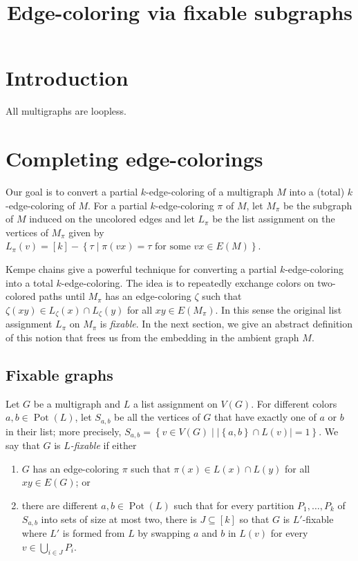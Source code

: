 \documentclass[12pt]{article}
\theoremstyle{plain}
\theoremstyle{definition}
\theoremstyle{remark}
\newcommand{\set}[1]{\left\{ #1 \right\}}
\newcommand{\setb}[3]{\left\{ #1 \in #2 \mid #3 \right\}}
\newcommand{\setbs}[2]{\left\{ #1 \mid #2 \right\}}
\newcommand{\card}[1]{\left|#1\right|}
\newcommand{\irange}[1]{\left[#1\right]}
\newcommand{\pot}{\operatorname{Pot}}
\begin{document}
\title{Edge-coloring via fixable subgraphs}
\maketitle

\section{Introduction}
All multigraphs are loopless.

\section{Completing edge-colorings}
Our goal is to convert a partial $k$-edge-coloring of a multigraph $M$ into a (total) $k$-edge-coloring of $M$.  For a partial $k$-edge-coloring $\pi$ of $M$, let $M_\pi$ be the subgraph of $M$ induced on the uncolored edges and let $L_\pi$ be the list assignment on the vertices of $M_\pi$ given by 
$L_\pi(v) = \irange{k} - \setbs{\tau}{\pi(vx) = \tau \text{ for some  } vx \in E(M)}$. 

Kempe chains give a powerful technique for converting a partial $k$-edge-coloring into a total $k$-edge-coloring.  The idea is to repeatedly exchange colors on two-colored paths until $M_\pi$ has an edge-coloring $\zeta$ such that $\zeta(xy) \in L_\zeta(x) \cap L_\zeta(y)$ for all $xy \in E(M_\pi)$.  In this sense the original list assignment $L_\pi$ on $M_\pi$ is \emph{fixable}. In the next section, we give an abstract definition of this notion that frees us from the embedding in the ambient graph $M$.

\subsection{Fixable graphs}
Let $G$ be a multigraph and $L$ a list assignment on $V(G)$.  For different colors $a,b \in \pot(L)$, let $S_{a,b}$ be all the vertices of $G$ that have exactly one of $a$ or $b$ in their list; more precisely, $S_{a,b} = \setb{v}{V(G)}{\card{\set{a,b} \cap L(v)} = 1}$.  We say that $G$ is \emph{$L$-fixable} if either
\begin{enumerate}
\item $G$ has an edge-coloring $\pi$ such that $\pi(x) \in L(x) \cap L(y)$ for all $xy \in E(G)$; or
\item there are different $a,b \in \pot(L)$ such that for every partition $P_1, \ldots, P_k$ of $S_{a,b}$ into sets of size at most two, 
      there is $J \subseteq \irange{k}$ so that $G$ is $L'$-fixable where $L'$ is formed from $L$ by swapping $a$ and $b$ in $L(v)$ for every $v \in \bigcup_{i \in J} P_i$.
\end{enumerate}
\end{document}
